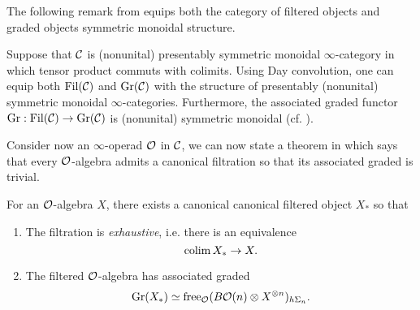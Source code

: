The following remark from \cite{Brantner-Mathew} equips both the category of filtered objects and graded objects symmetric monoidal structure.
\begin{remark}
\cite[Definition 2.5]{Brantner-Mathew}
Suppose that ${\mathcal{C}}$ is (nonunital) presentably symmetric monoidal $\infty$-category in which tensor product commuts with colimits.
Using Day convolution, one can equip both $\operatorname{\operatorname{Fil}}({\mathcal{C}})$ and $\operatorname{\operatorname{Gr}}({\mathcal{C}})$ with the structure of presentably (nonunital) symmetric monoidal $\infty$-categories. Furthermore, the associated graded functor $\operatorname{\operatorname{Gr}} : \operatorname{\operatorname{Fil}}({\mathcal{C}}) \to \operatorname{\operatorname{Gr}}({\mathcal{C}})$ is (nonunital) symmetric monoidal (cf. \cite[Sec. 2.23]{Glasman}).
\end{remark}

Consider now an $\infty$-operad ${\mathcal{O}}$ in ${\mathcal{C}}$, we can now state a theorem in \cite{Heuts_Koszul} which says that every ${\mathcal{O}}$-algebra admits a canonical filtration so that its associated graded is trivial.
\begin{theorem}
\label{Canonical grading on an O-algebra}
\cite[Theorem 5.2 (2)]{Heuts_Koszul}
For an ${\mathcal{O}}$-algebra $X$, there exists a canonical canonical filtered object $X_{*}$ so that 
\begin{enumerate}
    \item The filtration is \emph{exhaustive}, i.e. there is an equivalence
    $$
    \operatorname{colim} X_{*} \to X.
    $$
    \item The filtered ${\mathcal{O}}$-algebra has associated graded
    $$
    \operatorname{\operatorname{Gr}}(X_*)\simeq \operatorname{free}_{{\mathcal{O}}}(B{\mathcal{O}}(n)\otimes X^{\otimes n })_{h\Sigma_n}.
    $$
\end{enumerate}


\end{theorem}




